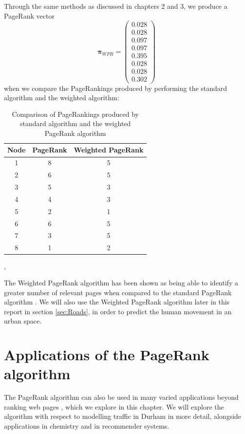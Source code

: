 \documentclass[11pt]{report}
\begin{document}
{Through the same methods as discussed in chapters 2 and 3, we produce a PageRank vector 
\[\boldsymbol\pi_{WPR} = \left(
\begin{array}{c}
0.028 \\
0.028 \\
0.097 \\
0.097 \\
0.395 \\
0.028 \\
0.028 \\
0.302
\end{array}
\right)\]
when we compare the PageRankings produced by performing the standard algorithm and the weighted algorithm:
\begin{table}[H] \caption{Comparison of PageRankings produced by standard algorithm and the weighted PageRank algorithm}
 \centering
 \begin{tabular} {c| c c} 
 Node & PageRank & Weighted PageRank \\ [0.5ex] 
 \hline
 1&8&5\\
 2&6&5\\
 3&5&3\\
 4&4&3\\
 5&2&1\\
 6&6&5\\
 7&3&5\\
 8&1&2\\
 \end{tabular}
 \label{Table:Weighted PageRank and PR}
\end{table}
\cite{langville}, \cite{baeza2004web}

The Weighted PageRank algorithm has been shown as being able to identify a greater number of relevant pages when compared to the standard PageRank algorithm \cite{xing2004weighted}. We will also use the Weighted PageRank algorithm later in this report in section \ref{sec:Roads}, in order to predict the human movement in an urban space. 


\chapter{Applications of the PageRank algorithm} \label{chap:Applications}
The PageRank algorithm can also be used in many varied applications beyond ranking web pages \cite{gleich2015pagerank}, which we explore in this chapter. We will explore the algorithm with respect to modelling traffic in Durham in more detail, alongside applications in chemistry and in recommender systems. 

}
\end{document}

